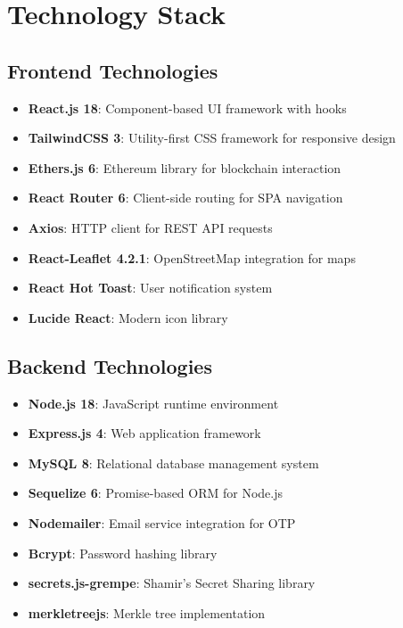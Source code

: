 \documentclass[12pt]{report}
\theoremstyle{plain}
\theoremstyle{definition}
\theoremstyle{remark}
\begin{document}
\section{Technology Stack}

\subsection{Frontend Technologies}

\begin{itemize}
    \item \textbf{React.js 18}: Component-based UI framework with hooks
    \item \textbf{TailwindCSS 3}: Utility-first CSS framework for responsive design
    \item \textbf{Ethers.js 6}: Ethereum library for blockchain interaction
    \item \textbf{React Router 6}: Client-side routing for SPA navigation
    \item \textbf{Axios}: HTTP client for REST API requests
    \item \textbf{React-Leaflet 4.2.1}: OpenStreetMap integration for maps
    \item \textbf{React Hot Toast}: User notification system
    \item \textbf{Lucide React}: Modern icon library
\end{itemize}

\subsection{Backend Technologies}

\begin{itemize}
    \item \textbf{Node.js 18}: JavaScript runtime environment
    \item \textbf{Express.js 4}: Web application framework
    \item \textbf{MySQL 8}: Relational database management system
    \item \textbf{Sequelize 6}: Promise-based ORM for Node.js
    \item \textbf{Nodemailer}: Email service integration for OTP
    \item \textbf{Bcrypt}: Password hashing library
    \item \textbf{secrets.js-grempe}: Shamir's Secret Sharing library
    \item \textbf{merkletreejs}: Merkle tree implementation
\end{itemize}
\end{document}
